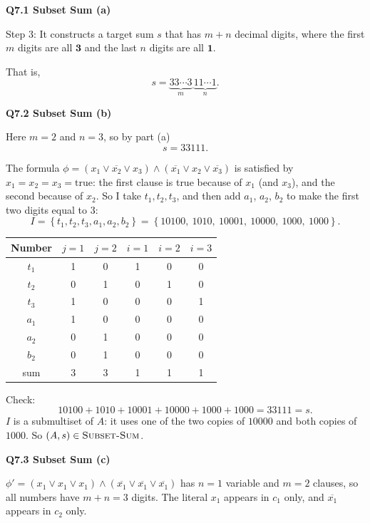 \documentclass[11pt]{article}
\newcommand{\set}[1]{\left\{#1\right\}}
\newcommand{\cproblem}[1]{\textsc{#1}}
\newcommand{\SSUM}{\cproblem{Subset-Sum}}
\newcommand{\qpage}[1]{\clearpage\noindent\textbf{\large #1}\par\medskip}
\begin{document}
\qpage{Q7.1 Subset Sum (a)}

Step 3: It constructs a target sum $s$ that has $m + n$ decimal digits, where the first $m$ digits are all $\mathbf{3}$ and the last $n$ digits are all $\mathbf{1}$.

That is,
\[
  s = \underbrace{33 \cdots 3}_{m} \, \underbrace{11 \cdots 1}_{n}.
\]

\qpage{Q7.2 Subset Sum (b)}

Here $m = 2$ and $n = 3$, so by part (a)
\[
  s = 33111.
\]

The formula $\phi = (x_1 \vee \overline{x_2} \vee x_3) \wedge (\overline{x_1} \vee x_2 \vee \overline{x_3})$ is satisfied by $x_1 = x_2 = x_3 = \text{true}$: the first clause is true because of $x_1$ (and $x_3$), and the second because of $x_2$.
So I take $t_1, t_2, t_3$, and then add $a_1$, $a_2$, $b_2$ to make the first two digits equal to $3$:
\[
  I = \set{t_1, t_2, t_3, a_1, a_2, b_2} = \set{10100,\ 1010,\ 10001,\ 10000,\ 1000,\ 1000}.
\]

\begin{center}
  \begin{tabular}{| c || c | c | c | c | c |}
    \hline
    Number & $j=1$ & $j=2$ & $i=1$ & $i=2$ & $i=3$ \\ \hline \hline
    $t_1$ & 1 & 0 & 1 & 0 & 0 \\ \hline
    $t_2$ & 0 & 1 & 0 & 1 & 0 \\ \hline
    $t_3$ & 1 & 0 & 0 & 0 & 1 \\ \hline
    $a_1$ & 1 & 0 & 0 & 0 & 0 \\ \hline
    $a_2$ & 0 & 1 & 0 & 0 & 0 \\ \hline
    $b_2$ & 0 & 1 & 0 & 0 & 0 \\ \hline \hline
    sum   & 3 & 3 & 1 & 1 & 1 \\ \hline
  \end{tabular}
\end{center}

Check:
\[
  10100 + 1010 + 10001 + 10000 + 1000 + 1000 = 33111 = s.
\]
$I$ is a submultiset of $A$: it uses one of the two copies of $10000$ and both copies of $1000$.
So $(A, s) \in \SSUM$.

\qpage{Q7.3 Subset Sum (c)}

$\phi' = (x_1 \vee x_1 \vee x_1) \wedge (\overline{x_1} \vee \overline{x_1} \vee \overline{x_1})$ has $n = 1$ variable and $m = 2$ clauses, so all numbers have $m + n = 3$ digits.
The literal $x_1$ appears in $c_1$ only, and $\overline{x_1}$ appears in $c_2$ only.
\end{document}
